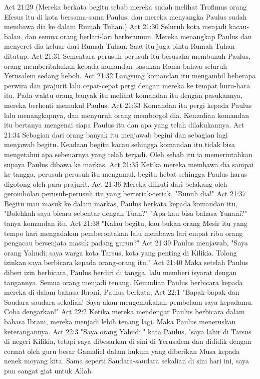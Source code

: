 Act 21:29  (Mereka berkata begitu sebab mereka sudah melihat Trofimus orang Efesus itu di kota bersama-sama Paulus; dan mereka menyangka Paulus sudah membawa dia ke dalam Rumah Tuhan.)
Act 21:30  Seluruh kota menjadi kacau-balau, dan semua orang berlari-lari berkerumun. Mereka menangkap Paulus dan menyeret dia keluar dari Rumah Tuhan. Saat itu juga pintu Rumah Tuhan ditutup.
Act 21:31  Sementara perusuh-perusuh itu berusaha membunuh Paulus, orang memberitahukan kepada komandan pasukan Roma bahwa seluruh Yerusalem sedang heboh.
Act 21:32  Langsung komandan itu mengambil beberapa perwira dan prajurit lalu cepat-cepat pergi dengan mereka ke tempat huru-hara itu. Pada waktu orang banyak itu melihat komandan itu dengan pasukannya, mereka berhenti memukul Paulus.
Act 21:33  Komandan itu pergi kepada Paulus lalu menangkapnya, dan menyuruh orang memborgol dia. Kemudian komandan itu bertanya mengenai siapa Paulus itu dan apa yang telah dilakukannya.
Act 21:34  Sebagian dari orang banyak itu menjawab begini dan sebagian lagi menjawab begitu. Keadaan begitu kacau sehingga komandan itu tidak bisa mengetahui apa sebenarnya yang telah terjadi. Oleh sebab itu ia memerintahkan supaya Paulus dibawa ke markas.
Act 21:35  Ketika mereka membawa dia sampai ke tangga, perusuh-perusuh itu mengamuk begitu hebat sehingga Paulus harus digotong oleh para prajurit.
Act 21:36  Mereka diikuti dari belakang oleh gerombolan perusuh-perusuh itu yang berteriak-teriak, "Bunuh dia!"
Act 21:37  Begitu mau masuk ke dalam markas, Paulus berkata kepada komandan itu, "Bolehkah saya bicara sebentar dengan Tuan?" "Apa kau bisa bahasa Yunani?" tanya komandan itu.
Act 21:38  "Kalau begitu, kau bukan orang Mesir itu yang tempo hari mengadakan pemberontakan lalu membawa lari empat ribu orang pengacau bersenjata masuk padang gurun?"
Act 21:39  Paulus menjawab, "Saya orang Yahudi; saya warga kota Tarsus, kota yang penting di Kilikia. Tolong izinkan saya berbicara kepada orang-orang itu."
Act 21:40  Maka setelah Paulus diberi izin berbicara, Paulus berdiri di tangga, lalu memberi isyarat dengan tangannya. Semua orang menjadi tenang. Kemudian Paulus berbicara kepada mereka di dalam bahasa Ibrani. Paulus berkata,
Act 22:1  "Bapak-bapak dan Saudara-saudara sekalian! Saya akan mengemukakan pembelaan saya kepadamu. Coba dengarkan!"
Act 22:2  Ketika mereka mendengar Paulus berbicara dalam bahasa Ibrani, mereka menjadi lebih tenang lagi. Maka Paulus meneruskan keterangannya.
Act 22:3  "Saya orang Yahudi," kata Paulus, "saya lahir di Tarsus di negeri Kilikia, tetapi saya dibesarkan di sini di Yerusalem dan dididik dengan cermat oleh guru besar Gamaliel dalam hukum yang diberikan Musa kepada nenek moyang kita. Sama seperti Saudara-saudara sekalian di sini hari ini, saya pun sangat giat untuk Allah.
